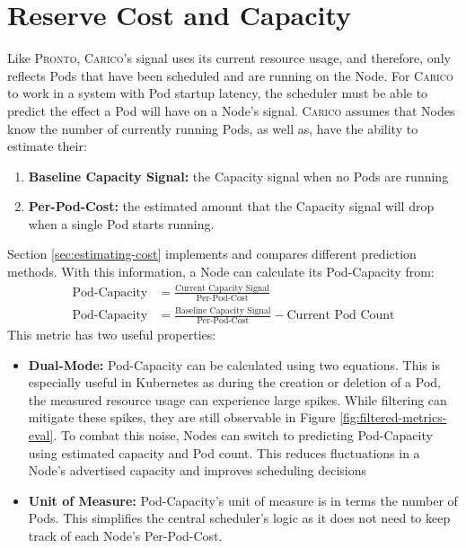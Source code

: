 \section{Reserve Cost and Capacity}
\label{sec:spazio-cost-capacity}
Like \textsc{Pronto}, \textsc{Carico}'s signal uses its current resource usage, and therefore, only
reflects Pods that have been scheduled and are running on the Node. For \textsc{Carico}
to work in a system with Pod startup latency, the scheduler must be able to
predict the effect a Pod will have on a Node's signal. \textsc{Carico} assumes that Nodes
know the number of currently running Pods, as well as, have the ability to
estimate their:
\begin{enumerate}
    \item \textbf{Baseline Capacity Signal:} the Capacity signal when no Pods
        are running
    \item \textbf{Per-Pod-Cost:} the estimated amount that the Capacity signal
        will drop when a single Pod starts running.
\end{enumerate}
Section \ref{sec:estimating-cost} implements and compares different prediction
methods. With this information, a Node can calculate its Pod-Capacity from:
\begin{align}
    \text{Pod-Capacity} &= \frac{\text{Current Capacity Signal}}{\text{Per-Pod-Cost}} \\
    \text{Pod-Capacity} &= \frac{\text{Baseline Capacity Signal}}{\text{Per-Pod-Cost}}
    - \text{Current Pod Count}
\end{align}
This metric has two useful properties:
\begin{itemize}
    \item \textbf{Dual-Mode:} Pod-Capacity can be calculated
        using two equations. This is especially useful in Kubernetes as during
        the creation or deletion of a Pod, the measured resource usage
        can experience large spikes. While filtering can mitigate these spikes,
        they are still observable in Figure \ref{fig:filtered-metrics-eval}. To
        combat this noise, Nodes can switch to predicting Pod-Capacity using
        estimated capacity and Pod count. This reduces fluctuations in a Node's
        advertised capacity and improves scheduling decisions
    \item \textbf{Unit of Measure:} Pod-Capacity's  unit of measure is in terms
        the number of Pods. This simplifies the central scheduler's logic as it
        does not need to keep track of each Node's Per-Pod-Cost.
\end{itemize}

